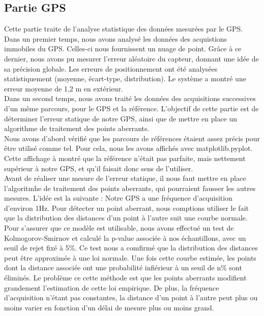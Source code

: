 \subsection{Partie GPS}
Cette partie traite de l'analyse statistique des données mesurées par le GPS.
Dans un premier temps, nous avons analysé les données des acquistions immobiles du GPS. Celles-ci nous fournissent un nuage de point. Grâce à ce dernier, nous avons pu mesurer l'erreur aléatoire du capteur, donnant une idée de sa précision globale. Les erreurs de positionnement ont été analysées statistiquement (moyenne, écart-type, distribution). Le système a montré une erreur moyenne de 1,2 m en extérieur. \\

Dans un second temps, nous avons traité les données des acquisitions successives d'un même parcours, pour le GPS et la référence. L'objectif de cette partie est de déterminer l'erreur statique de notre GPS, ainsi que de mettre en place un algorithme de traitement des points aberrants. \\

Nous avons d'abord vérifié que les parcours de références étaient assez précis pour être utilisé comme tel. Pour cela, nous les avons affichés avec matplotlib.pyplot. Cette affichage à montré que la référence n'était pas parfaite, mais nettement supérieur à notre GPS, et qu'il faisait donc sens de l'utiliser. \\

Avant de réaliser une mesure de l'erreur statique, il nous faut mettre en place l'algoritmhe de traitement des points aberrants, qui pourraient fausser les autres mesures. L'idée est la suivante :
Notre GPS a une fréquence d'acquisition d'environ 1Hz. Pour détecter un point aberrant, nous comptions utiliser le fait que la distribution des distances d'un point à l'autre suit une courbe normale. Pour s'assurer que ce modèle est utilisable, nous avons effectué un test de Kolmogorov-Smirnov et calculé la p-value associée à nos échantillons, avec un seuil de rejet fixé à 5\%. Ce test nous a comfirmé que la distribution des distances peut être approximée à une loi normale. Une fois cette courbe estimée, les points dont la distance associée ont une probabilité infiérieur à un seuil de n\% sont éliminés. Le problème ce cette méthode est que les points aberrants modifient grandement l'estimation de cette loi empirique. De plus, la fréquence d'acquisition n'étant pas constantes, la distance d'un point à l'autre peut plus ou moins varier en fonction d'un délai de mesure plus ou moins grand. \\

